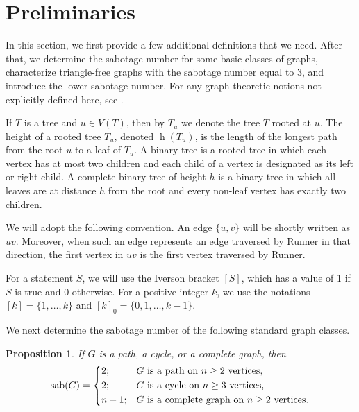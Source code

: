 \documentclass[12pt]{article}
\newtheorem{proposition}[theorem]{Proposition}
\DeclareMathOperator{\sab}{\mathrm{sab}}
\DeclareMathOperator{\height}{\mathrm{h}}
\begin{document}
\section{Preliminaries}
\label{sec:preliminaries}

In this section, we first provide a few additional definitions that we need. After that, we determine the sabotage number for some basic classes of graphs, characterize triangle-free graphs with the sabotage number equal to $3$, and introduce the lower sabotage number. For any graph theoretic notions not explicitly defined here, see \cite{west-2001}.

If $T$ is a tree and $u \in V(T)$, then by $T_u$ we denote the tree $T$ rooted at $u$. The height of a rooted tree $T_u$, denoted $\height(T_u)$, is the length of the longest path from the root $u$ to a leaf of $T_u$. A binary tree is a rooted tree in which each vertex has at most two children and each child of a vertex is designated as its left or right child. A complete binary tree of height $h$ is a binary tree in which all leaves are at distance $h$ from the root and every non-leaf vertex has exactly two children.

We will adopt the following convention. An edge $\{u,v\}$ will be shortly written as $uv$. Moreover, when such an edge represents an edge traversed by Runner in that direction, the first vertex in $uv$ is the first vertex traversed by Runner. 

For a statement $S$, we will use the Iverson bracket $[S]$, which has a value of 1 if $S$ is true and 0 otherwise. For a positive integer $k$, we use the notations $[k] = \{1,\dots, k\}$ and $[k]_0 = \{0,1,\dots,k-1\}$.  

We next determine the sabotage number of the following standard graph classes. 

\begin{proposition}\label{prp:path-cycle-complete}
If $G$ is a path, a cycle, or a complete graph, then 
\[
\sab(G) = \begin{dcases}
            2; & G \text{ is a path on } n\geq 2 \text{ vertices,} \\
            2; & G \text{ is a cycle on } n\geq 3 \text{ vertices,} \\
            n-1; & G \text{ is a complete graph on } n\geq 2 \text{ vertices.} \\
          \end{dcases}
\]
\end{proposition}
\end{document}
